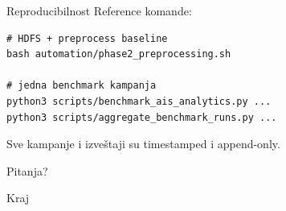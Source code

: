 \documentclass[aspectratio=169,11pt]{beamer}
\begin{document}
\begin{frame}[fragile]{Reproducibilnost}
  Reference komande:
  \begin{verbatim}
# HDFS + preprocess baseline
bash automation/phase2_preprocessing.sh

# jedna benchmark kampanja
python3 scripts/benchmark_ais_analytics.py ...
python3 scripts/aggregate_benchmark_runs.py ...
  \end{verbatim}

  Sve kampanje i izveštaji su timestamped i append-only.
\end{frame}

\begin{frame}
  \centering
  {\Huge Pitanja?}

  \vspace{0.8cm}
  {\Large Kraj}
\end{frame}
\end{document}
